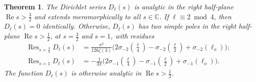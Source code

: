 \documentclass[11pt,reqno]{amsart}
\theoremstyle{plain}
\newtheorem{theorem}{Theorem}[section]
\theoremstyle{definition}
\numberwithin{equation}{section}
\renewcommand{\Re}{\operatorname{Re}}
\DeclareMathOperator*{\Res}{Res}
\begin{document}
\begin{theorem} \label{thm:D_h-poles}
The Dirichlet series $D_\ell(s)$ is analytic in the right half-plane $\Re s > \frac{3}{2}$ and extends meromorphically to all $s \in \mathbb{C}$. If $\ell \equiv 2 \bmod 4$, then $D_\ell(s) = 0$ identically. Otherwise, $D_\ell(s)$ has two simple poles in the right half-plane $\Re s > \frac{1}{2}$, at $s=\frac{3}{2}$ and $s=1$, with residues
\begin{align*}
	\Res_{s=\frac{3}{2}} D_\ell(s) &= 
			 \frac{\pi^2}{126\zeta(3)}
				\big(2\sigma_{-2}(\tfrac{\ell}{4}) - \sigma_{-2}(\tfrac{\ell}{2})+\sigma_{-2}(\ell_o) \big); \\
	\Res_{s=1} D_\ell(s) &=
				-\frac{1}{3\pi}
				\big(2\sigma_{-1}(\tfrac{\ell}{4}) - \sigma_{-1}(\tfrac{\ell}{2})+\sigma_{-1}(\ell_o) \big).
\end{align*}
The function $D_\ell(s)$ is otherwise analytic in $\Re s > \frac{1}{2}$.
\end{theorem}
\end{document}
